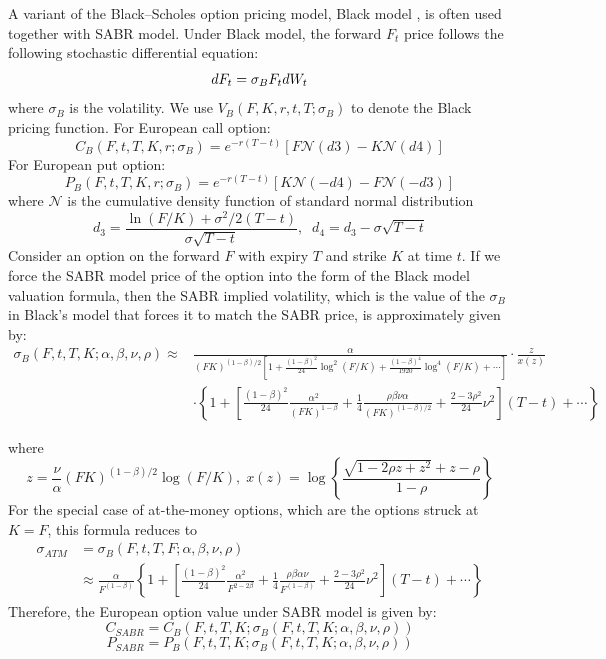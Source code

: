 \documentclass[letterpaper,12pt,titlepage,oneside,final]{book}
\numberwithin{equation}{section}
\theoremstyle{definition}
\begin{document}
A variant of the Black–Scholes option pricing model, Black model \cite{black1976pricing}, is often used together with SABR model. Under Black model, the  forward $F_t$ price follows the following stochastic differential equation:
\[
dF_t=\sigma_B F_t dW_t\\
\]
where $\sigma_B$ is the volatility. We use $V_B(F,K,r,t,T;\sigma_{B})$ to denote the Black pricing function. For European call option:
\[
C_B(F,t,T,K,r;\sigma_{B})=e^{-r(T-t)}[F \mathcal{N} (d3)-K  \mathcal{N} (d4)]
\]
For European put option:
\[
P_B(F,t,T,K,r;\sigma_{B})=e^{-r(T-t)}[K  \mathcal{N} (-d4)-F  \mathcal{N} (-d3)]
\]
where $\mathcal{N}$ is the cumulative density function of standard normal distribution
\[
d_3=\frac{\ln(F/K)+\sigma^2/2(T-t)}{\sigma \sqrt{T-t}}, \;\; d_4=d_3-\sigma  \sqrt{T-t}
\]
Consider an option on the forward $F$ with expiry $T$ and strike $K$ at time $t$.
If we force the SABR model price of the option into the form of the Black model valuation formula, then the SABR implied volatility, which is the value of the $\sigma_B$ in Black's model that forces it to match the SABR price, is approximately given by:
\begin{equation}
\begin{split}
	\sigma_{B}(F,t,T,K;\alpha,\beta,\nu,\rho) \approx&
	\frac{\alpha}{(FK)^{(1-\beta)/2}\left[1+\frac{(1-\beta)^2}{24}\log^2(F/K)
		+ \frac{(1-\beta)^4}{1920}\log^4(F/K) + \cdots\right]} \cdot
	\frac{z}{x(z)}  \\
	&  \cdot \left\{1+\left[\frac{(1-\beta)^2}{24}\frac{\alpha^2}{(FK)^{1-\beta}}
	+ \frac{1}{4} \frac{\rho\beta\nu\alpha}{(FK)^{(1-\beta)/2}} +
	\frac{2-3\rho^2}{24}\nu^2 \right](T-t)+\cdots\right\}
\end{split}
\label{eq:SABRExpansion}
\end{equation}

where
\[
z = \frac{\nu}{\alpha}(FK)^{(1-\beta)/2}\log (F/K),\; x(z) =
\log\left\{\frac{\sqrt{1-2\rho z + z^2}+z-\rho}{1-\rho}\right\}
\]
For the special case of at-the-money options, which are the options struck at $K=F$,
this formula reduces to
\[
\begin{split}
\sigma_{ATM} &= \sigma_{B}(F,t,T,F;\alpha,\beta,\nu,\rho) \\
&\approx
\frac{\alpha}{F^{(1-\beta)}}\left\{1 +
\left[\frac{(1-\beta)^2}{24}\frac{\alpha^2}{F^{2-2\beta}} +
\frac{1}{4}\frac{\rho\beta\alpha\nu}{F^{(1-\beta)}} +
\frac{2-3\rho^2}{24}\nu^2 \right] (T-t) + \cdots \right\}
\end{split}
\]
Therefore, the European option value under SABR model is given by:
\[
C_{SABR}=C_B(F,t,T,K;\sigma_{B}(F,t,T,K;\alpha,\beta,\nu,\rho))
\]
\[
P_{SABR}=P_B(F,t,T,K;\sigma_{B}(F,t,T,K;\alpha,\beta,\nu,\rho))
\]
\end{document}
